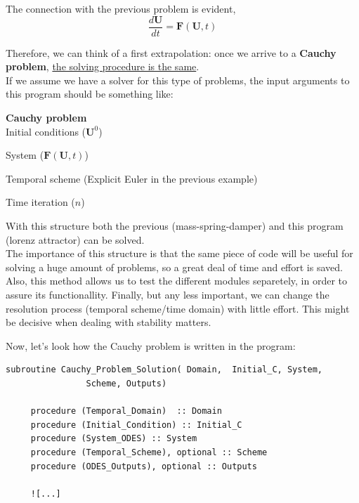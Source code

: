 The connection with the previous problem is evident, 
$$
\frac{d \mathbf{U}}{dt}= \mathbf{F}(\mathbf{U},t)
$$

Therefore, we can think of a first extrapolation: once we arrive to a
\textbf{Cauchy problem}, \underline{the solving procedure is the same}.\\

\newpage
If we assume we have a solver for this type of problems, the input arguments to
this program should be something like: \\

\begin{framed}
\textbf{Cauchy problem} \\

\hspace{1cm} Initial conditions ($\mathbf{U}^0$)

\hspace{1cm} System ($\mathbf{F}(\mathbf{U},t)$)

\hspace{1cm} Temporal scheme (Explicit Euler in the previous example)

\hspace{1cm} Time iteration ($n$)
\end{framed}

\vspace{1 cm}

With this structure both the previous (mass-spring-damper) and this program
(lorenz attractor) can be solved.\\

The importance of this structure is that the same piece of code will be useful
for solving a huge amount of problems, so a great deal of time and effort is
saved. Also, this method allows us to test the different modules separetely, in
order to assure its functionallity. Finally, but any less important, we can
change the resolution process (temporal scheme/time domain) with little effort.
This might be decisive when dealing with stability matters. \\

\newpage

Now, let's look how the Cauchy problem is written in the program: \\

\begin{blueframed}
{\small
\begin{lstlisting}
subroutine Cauchy_Problem_Solution( Domain,  Initial_C, System, 
				Scheme, Outputs) 
        
     procedure (Temporal_Domain)  :: Domain 
     procedure (Initial_Condition) :: Initial_C
     procedure (System_ODES) :: System
     procedure (Temporal_Scheme), optional :: Scheme
     procedure (ODES_Outputs), optional :: Outputs 
     
     ![...]
\end{lstlisting}
}
\end{blueframed}

